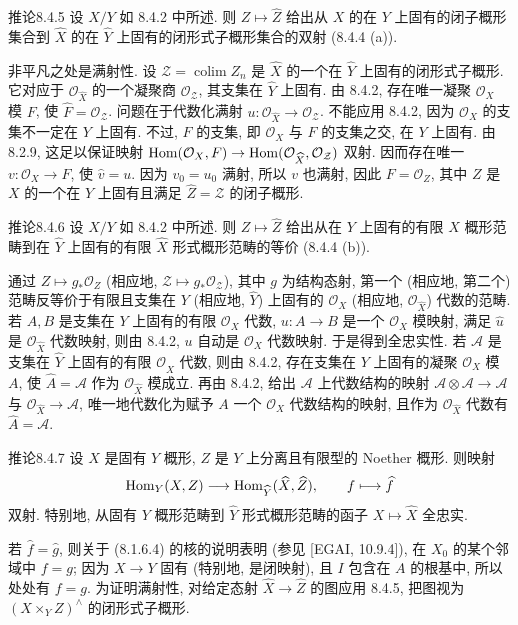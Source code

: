 \begin{origstatement}{推论}{8.4.5}\label{ch08:cor845}
设 $X/Y$ 如 8.4.2 中所述. 则 $Z\mapsto\widehat Z$ 给出从 $X$ 的在 $Y$ 上固有的闭子概形集合到 $\widehat X$ 的在 $\widehat Y$ 上固有的闭形式子概形集合的双射 (8.4.4 (a)).
\end{origstatement}
非平凡之处是满射性. 设 $\mathcal Z=\operatorname{colim}Z_n$ 是 $\widehat X$ 的一个在 $\widehat Y$ 上固有的闭形式子概形. 它对应于 $\mathcal O_{\widehat X}$ 的一个凝聚商 $\mathcal O_{\mathcal Z}$, 其支集在 $\widehat Y$ 上固有. 由 8.4.2, 存在唯一凝聚 $\mathcal O_X$ 模 $F$, 使 $\widehat F=\mathcal O_{\mathcal Z}$. 问题在于代数化满射 $u:\mathcal O_{\widehat X}\to\mathcal O_{\mathcal Z}$. 不能应用 8.4.2, 因为 $\mathcal O_X$ 的支集不一定在 $Y$ 上固有. 不过, $F$ 的支集, 即 $\mathcal O_X$ 与 $F$ 的支集之交, 在 $Y$ 上固有. 由 8.2.9, 这足以保证映射 $\operatorname{Hom}(\mathcal O_X,F)\to\operatorname{Hom}(\mathcal O_{\widehat X},\mathcal O_{\mathcal Z})$ 双射. 因而存在唯一 $v:\mathcal O_X\to F$, 使 $\widehat v=u$. 因为 $v_0=u_0$ 满射, 所以 $v$ 也满射, 因此 $F=\mathcal O_Z$, 其中 $Z$ 是 $X$ 的一个在 $Y$ 上固有且满足 $\widehat Z=\mathcal Z$ 的闭子概形.

\begin{origstatement}{推论}{8.4.6}\label{ch08:cor846}
设 $X/Y$ 如 8.4.2 中所述. 则 $Z\mapsto\widehat Z$ 给出从在 $Y$ 上固有的有限 $X$ 概形范畴到在 $\widehat Y$ 上固有的有限 $\widehat X$ 形式概形范畴的等价 (8.4.4 (b)).
\end{origstatement}
通过 $Z\mapsto g_*\mathcal O_Z$ (相应地, $\mathcal Z\mapsto g_*\mathcal O_{\mathcal Z}$), 其中 $g$ 为结构态射, 第一个 (相应地, 第二个) 范畴反等价于有限且支集在 $Y$ (相应地, $\widehat Y$) 上固有的 $\mathcal O_X$ (相应地, $\mathcal O_{\widehat X}$) 代数的范畴. 若 $A,B$ 是支集在 $Y$ 上固有的有限 $\mathcal O_X$ 代数, $u:A\to B$ 是一个 $\mathcal O_X$ 模映射, 满足 $\widehat u$ 是 $\mathcal O_{\widehat X}$ 代数映射, 则由 8.4.2, $u$ 自动是 $\mathcal O_X$ 代数映射. 于是得到全忠实性. 若 $\mathcal A$ 是支集在 $\widehat Y$ 上固有的有限 $\mathcal O_{\widehat X}$ 代数, 则由 8.4.2, 存在支集在 $Y$ 上固有的凝聚 $\mathcal O_X$ 模 $A$, 使 $\widehat A=\mathcal A$ 作为 $\mathcal O_{\widehat X}$ 模成立. 再由 8.4.2, 给出 $\mathcal A$ 上代数结构的映射 $\mathcal A\otimes\mathcal A\to\mathcal A$ 与 $\mathcal O_{\widehat X}\to\mathcal A$, 唯一地代数化为赋予 $A$ 一个 $\mathcal O_X$ 代数结构的映射, 且作为 $\mathcal O_{\widehat X}$ 代数有 $\widehat A=\mathcal A$.

\begin{origstatement}{推论}{8.4.7}\label{ch08:cor847}
设 $X$ 是固有 $Y$ 概形, $Z$ 是 $Y$ 上分离且有限型的 Noether 概形. 则映射
\[\operatorname{Hom}_Y(X,Z)\longrightarrow\operatorname{Hom}_{\widehat Y}(\widehat X,\widehat Z),\qquad f\longmapsto\widehat f\]
双射. 特别地, 从固有 $Y$ 概形范畴到 $\widehat Y$ 形式概形范畴的函子 $X\mapsto\widehat X$ 全忠实.
\end{origstatement}
若 $\widehat f=\widehat g$, 则关于 (8.1.6.4) 的核的说明表明 (参见 [EGAI, 10.9.4]), 在 $X_0$ 的某个邻域中 $f=g$; 因为 $X\to Y$ 固有 (特别地, 是闭映射), 且 $I$ 包含在 $A$ 的根基中, 所以处处有 $f=g$. 为证明满射性, 对给定态射 $\widehat X\to\widehat Z$ 的图应用 8.4.5, 把图视为 $(X\times_YZ)^\wedge$ 的闭形式子概形.

